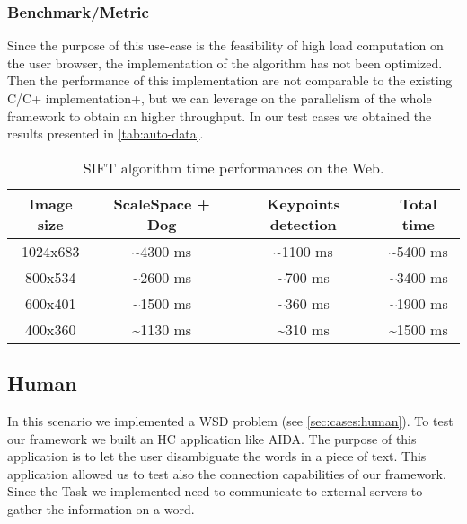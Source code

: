 \subsubsection{Benchmark/Metric}
Since the purpose of this use-case is the feasibility of high load computation
on the user browser, the implementation of the algorithm has not been optimized.
Then the performance of this implementation are not comparable to the existing
C/C+ implementation+, but we can leverage on the parallelism of the whole
framework to obtain an higher throughput. In our test cases we obtained the
results presented in \autoref{tab:auto-data}.
\begin{table}[htb]
    \caption{\acs{SIFT} algorithm time performances on the Web.}
    \label{tab:auto-data}
    \centering
    \begin{tabular}{c|c|c|c}
        \textbf{Image size} & \textbf{ScaleSpace + Dog} & \textbf{Keypoints
        detection} & \textbf{Total time}\\
        \hline
        1024x683 & \textasciitilde{}4300 ms & \textasciitilde{}1100 ms & \textasciitilde{}5400 ms\\
        \hline
        800x534 & \textasciitilde{}2600 ms & \textasciitilde{}700 ms & \textasciitilde{}3400 ms\\
        \hline
        600x401 & \textasciitilde{}1500 ms & \textasciitilde{}360 ms & \textasciitilde{}1900 ms\\
        \hline
        400x360 & \textasciitilde{}1130 ms & \textasciitilde{}310 ms & \textasciitilde{}1500 ms\\
        \hline
    \end{tabular}
\end{table}

















\subsection{Human}
In this scenario we implemented a \acf{WSD} problem (see \ref{sec:cases:human}).
To test our framework we built an \acl{HC} application like AIDA. The purpose of
this application is to let the user disambiguate the words in a piece of text.
This application allowed us to test also the connection capabilities of our
framework. Since the Task we implemented need to communicate to external servers
to gather the information on a word.

